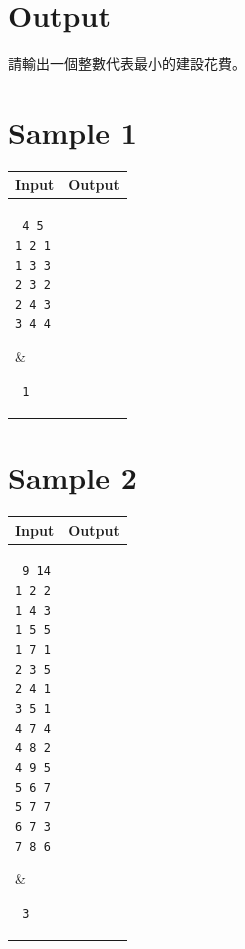 \documentclass[11pt,a4paper]{article}
\begin{document}
\section*{Output}

請輸出一個整數代表最小的建設花費。

\section*{Sample 1}
\begin{longtable}[!h]{|p{}|p{}|}
\hline
\textbf {Input}	& \textbf {Output} \\
\hline
\parbox[t]{0.5\textwidth} %
{ \tt
4 5 \\
1 2 1 \\
1 3 3 \\
2 3 2 \\
2 4 3 \\
3 4 4 \\
} &
\parbox[t]{0.5\textwidth}
{ \tt
1 \\
} \\
\hline
\end{longtable}

\section*{Sample 2}
\begin{longtable}[!h]{|p{}|p{}|}
\hline
\textbf {Input}	& \textbf {Output} \\
\hline
\parbox[t]{0.5\textwidth} %
{ \tt
9 14 \\
1 2 2 \\
1 4 3 \\
1 5 5 \\
1 7 1 \\
2 3 5 \\
2 4 1 \\
3 5 1 \\
4 7 4 \\
4 8 2 \\
4 9 5 \\
5 6 7 \\
5 7 7 \\
6 7 3 \\
7 8 6 \\
} &
\parbox[t]{0.5\textwidth}
{ \tt
3 \\
} \\
\hline
\end{longtable}
\end{document}
